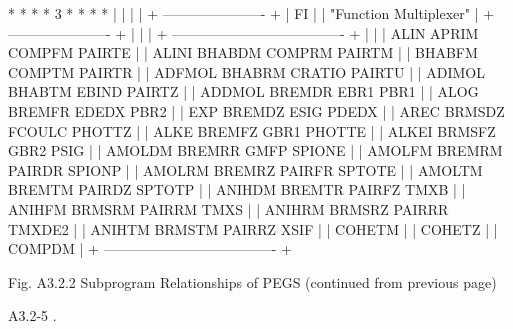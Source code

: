 \newpage {} 
\begin{center}
\begin{boxedverbatim}
                               *
                              * *
                             * 3 *
                              * *
                               *
                               |
                               |
                               |
                               |
                  + ---------------------- +
                  |           FI           |
                  | "Function Multiplexer" |
                  + ---------------------- +
                               |
                               |
                               |
           + ------------------------------------- +
           |                                       |
           |   ALIN     APRIM    COMPFM   PAIRTE   |
           |   ALINI    BHABDM   COMPRM   PAIRTM   |
           |            BHABFM   COMPTM   PAIRTR   |
           |   ADFMOL   BHABRM   CRATIO   PAIRTU   |
           |   ADIMOL   BHABTM   EBIND    PAIRTZ   |
           |   ADDMOL   BREMDR   EBR1     PBR1     |
           |   ALOG     BREMFR   EDEDX    PBR2     |
           |   EXP      BREMDZ   ESIG     PDEDX    |
           |   AREC     BRMSDZ   FCOULC   PHOTTZ   |
           |   ALKE     BREMFZ   GBR1     PHOTTE   |
           |   ALKEI    BRMSFZ   GBR2     PSIG     |
           |   AMOLDM   BREMRR   GMFP     SPIONE   |
           |   AMOLFM   BREMRM   PAIRDR   SPIONP   |
           |   AMOLRM   BREMRZ   PAIRFR   SPTOTE   |
           |   AMOLTM   BREMTM   PAIRDZ   SPTOTP   |
           |   ANIHDM   BREMTR   PAIRFZ   TMXB     |
           |   ANIHFM   BRMSRM   PAIRRM   TMXS     |
           |   ANIHRM   BRMSRZ   PAIRRR   TMXDE2   |
           |   ANIHTM   BRMSTM   PAIRRZ   XSIF     |
           |            COHETM                     |
           |            COHETZ                     |
           |            COMPDM                     |
           + ------------------------------------- +
 
      Fig. A3.2.2  Subprogram Relationships of PEGS
                   (continued from previous page)


 A3.2-5                                                       . 
\end{boxedverbatim} 
\end{center}
